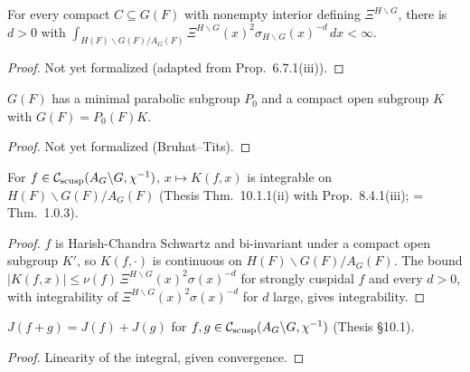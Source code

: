 \begin{proposition}
\label{prop_6_7_1_iii}
\leanok
{}
For every compact $C\subseteq G(F)$ with nonempty interior defining $\Xi^{H\backslash G}$, there is $d>0$ with $\int_{H(F)\backslash G(F)/A_G(F)}\Xi^{H\backslash G}(x)^2\sigma_{H\backslash G}(x)^{-d}\,dx<\infty$.
\end{proposition}
\begin{proof}
Not yet formalized (adapted from \cite{BP} Prop.~6.7.1(iii)).
\end{proof}

\begin{proposition}
\label{exists_iwasawaDatum}
\leanok
{}
$G(F)$ has a minimal parabolic subgroup $P_0$ and a compact open subgroup $K$ with $G(F)=P_0(F)K$.
\end{proposition}
\begin{proof}
Not yet formalized (Bruhat--Tits).
\end{proof}

\begin{theorem}[Convergence of $J$]
\label{distribJ_convergent}
\leanok
{}
For $f\in\mathcal{C}_{\mathrm{scusp}}(A_G\backslash G,\chi^{-1})$, $x\mapsto K(f,x)$ is integrable on $H(F)\backslash G(F)/A_G(F)$
(Thesis Thm.~10.1.1(ii) with Prop.~8.4.1(iii); = Thm.~1.0.3).
\end{theorem}
\begin{proof}
\leanok
{}
$f$ is Harish-Chandra Schwartz and bi-invariant under a compact open subgroup $K'$, so $K(f,\cdot)$ is
continuous on $H(F)\backslash G(F)/A_G(F)$. The bound $|K(f,x)|\le\nu(f)\,\Xi^{H\backslash G}(x)^2\sigma(x)^{-d}$
for strongly cuspidal $f$ and every $d>0$, with integrability of $\Xi^{H\backslash G}(x)^2\sigma(x)^{-d}$ for $d$ large, gives
integrability.
\end{proof}

\begin{lemma}[$J$ is linear]
\label{distribJ_add}
\leanok
{}
$J(f+g)=J(f)+J(g)$ for $f,g\in\mathcal{C}_{\mathrm{scusp}}(A_G\backslash G,\chi^{-1})$ (Thesis \S10.1).
\end{lemma}
\begin{proof}
\leanok
{}
Linearity of the integral, given convergence.
\end{proof}

